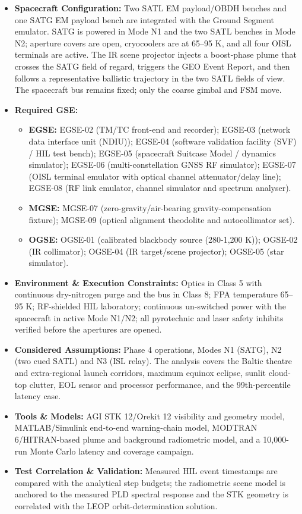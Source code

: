 \begin{itemize}
\item \textbf{Spacecraft Configuration:} Two SATL EM payload/OBDH benches and one SATG EM payload bench are integrated with the Ground Segment emulator. SATG is powered in Mode N1 and the two SATL benches in Mode N2; aperture covers are open, cryocoolers are at 65--95 K, and all four OISL terminals are active. The IR scene projector injects a boost-phase plume that crosses the SATG field of regard, triggers the GEO Event Report, and then follows a representative ballistic trajectory in the two SATL fields of view. The spacecraft bus remains fixed; only the coarse gimbal and FSM move.
\item \textbf{Required GSE:}
\begin{itemize}
\item \textbf{EGSE:} EGSE-02 (TM/TC front-end and recorder); EGSE-03 (network data interface unit (NDIU)); EGSE-04 (software validation facility (SVF) / HIL test bench); EGSE-05 (spacecraft Suitcase Model / dynamics simulator); EGSE-06 (multi-constellation GNSS RF simulator); EGSE-07 (OISL terminal emulator with optical channel attenuator/delay line); EGSE-08 (RF link emulator, channel simulator and spectrum analyser).
\item \textbf{MGSE:} MGSE-07 (zero-gravity/air-bearing gravity-compensation fixture); MGSE-09 (optical alignment theodolite and autocollimator set).
\item \textbf{OGSE:} OGSE-01 (calibrated blackbody source (280-1,200 K)); OGSE-02 (IR collimator); OGSE-04 (IR target/scene projector); OGSE-05 (star simulator).
\end{itemize}
\item \textbf{Environment \& Execution Constraints:} Optics in Class 5 with continuous dry-nitrogen purge and the bus in Class 8; FPA temperature 65--95 K; RF-shielded HIL laboratory; continuous un-switched power with the spacecraft in active Mode N1/N2; all pyrotechnic and laser safety inhibits verified before the apertures are opened.
\item \textbf{Considered Assumptions:} Phase 4 operations, Modes N1 (SATG), N2 (two cued SATL) and N3 (ISL relay). The analysis covers the Baltic theatre and extra-regional launch corridors, maximum equinox eclipse, sunlit cloud-top clutter, EOL sensor and processor performance, and the 99th-percentile latency case.
\item \textbf{Tools \& Models:} AGI STK 12/Orekit 12 visibility and geometry model, MATLAB/Simulink end-to-end warning-chain model, MODTRAN 6/HITRAN-based plume and background radiometric model, and a 10,000-run Monte Carlo latency and coverage campaign.
\item \textbf{Test Correlation \& Validation:} Measured HIL event timestamps are compared with the analytical step budgets; the radiometric scene model is anchored to the measured PLD spectral response and the STK geometry is correlated with the LEOP orbit-determination solution.
\end{itemize}
